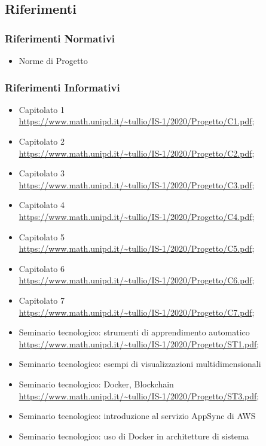 \subsection{Riferimenti}
\subsubsection{Riferimenti Normativi}
\begin{itemize}
	\item Norme di Progetto %
\end{itemize}

\subsubsection{Riferimenti Informativi}
\begin{itemize}
	\item{Capitolato 1\\
		\url{https://www.math.unipd.it/~tullio/IS-1/2020/Progetto/C1.pdf}};
	\item{Capitolato 2\\
		\url{https://www.math.unipd.it/~tullio/IS-1/2020/Progetto/C2.pdf}};
	\item{Capitolato 3\\
		\url{https://www.math.unipd.it/~tullio/IS-1/2020/Progetto/C3.pdf}};
	\item{Capitolato 4\\
		\url{https://www.math.unipd.it/~tullio/IS-1/2020/Progetto/C4.pdf}};
	\item{Capitolato 5\\
		\url{https://www.math.unipd.it/~tullio/IS-1/2020/Progetto/C5.pdf}};
	\item{Capitolato 6\\
		\url{https://www.math.unipd.it/~tullio/IS-1/2020/Progetto/C6.pdf}};
	\item{Capitolato 7\\
		\url{https://www.math.unipd.it/~tullio/IS-1/2020/Progetto/C7.pdf}};
	
	\item {Seminario tecnologico: strumenti di apprendimento automatico\\
		\url{https://www.math.unipd.it/~tullio/IS-1/2020/Progetto/ST1.pdf}};
	\item {Seminario tecnologico: esempi di visualizzazioni multidimensionali}
	
	\item {Seminario tecnologico: Docker, Blockchain\\
		\url{https://www.math.unipd.it/~tullio/IS-1/2020/Progetto/ST3.pdf}};
	\item {Seminario tecnologico: introduzione al servizio AppSync di AWS}
	
	\item {Seminario tecnologico: uso di Docker in architetture di sistema}
\end{itemize}

